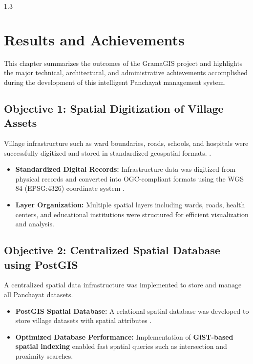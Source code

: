 \newpage
\thispagestyle{empty}
%
\begin{spacing}{1.3}
%
\chapter{Results and Achievements}

This chapter summarizes the outcomes of the GramaGIS project and highlights the major technical, architectural, and administrative achievements accomplished during the development of this intelligent Panchayat management system.

\section{Objective 1: Spatial Digitization of Village Assets}

Village infrastructure such as ward boundaries, roads, schools, and hospitals were successfully digitized and stored in standardized geospatial formats. \cite{fu2020webgis}.

\begin{itemize}
    \item \textbf{Standardized Digital Records:} Infrastructure data was digitized from physical records and converted into OGC-compliant formats using the WGS 84 (EPSG:4326) coordinate system \cite{smart_panchayat2023}.
    \item \textbf{Layer Organization:} Multiple spatial layers including wards, roads, health centers, and educational institutions were structured for efficient visualization and analysis.
\end{itemize}

\section{Objective 2: Centralized Spatial Database using PostGIS}

A centralized spatial data infrastructure was implemented to store and manage all Panchayat datasets.

\begin{itemize}
    \item \textbf{PostGIS Spatial Database:} A relational spatial database was developed to store village datasets with spatial attributes \cite{postgis_in_action}.
    \item \textbf{Optimized Database Performance:} Implementation of \textbf{GiST-based spatial indexing} enabled fast spatial queries such as intersection and proximity searches.
\end{itemize}


\end{spacing}

